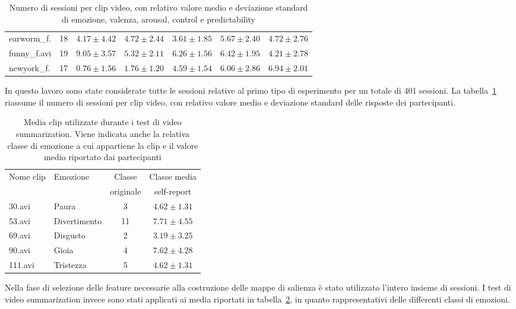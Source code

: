\begin{table}[]
\begin{tabular}{l|c|c|c|c|c|c}
earworm\_f. & 18 & $4.17 \pm 4.42$ & $4.72 \pm 2.44$ & $3.61 \pm 1.85$ & $5.67 \pm 2.40$ & $4.72 \pm 2.76$ \\
funny\_f.avi & 19 & $9.05 \pm 3.57$ & $5.32 \pm 2.11$ & $6.26 \pm 1.56$ & $6.42 \pm 1.95$ & $4.21 \pm 2.78$ \\
newyork\_f. & 17 & $0.76 \pm 1.56$ & $1.76 \pm 1.20$ & $4.59 \pm 1.54$ & $6.06 \pm 2.86$ & $6.94 \pm 2.01$ \\
\end{tabular}
\caption{Numero di sessioni per clip video, con relativo valore medio e deviazione standard di emozione, valenza, arousal, control e predictability}
\label{tab:sessionid_by_media}
\end{table}

In questo lavoro sono state considerate tutte le sessioni relative al primo tipo di esperimento per un totale di 401 sessioni.
La tabella~\ref{tab:sessionid_by_media} riassume il numero di sessioni per clip video, con relativo valore medio e deviazione standard delle risposte dei partecipanti.

\begin{table}[]
\begin{tabular}{l|l|c|c}
Nome clip   & Emozione     & Classe    & Classe media \\
            &              & originale & self-report \\
\hline
30.avi      & Paura        & 3         & $4.62 \pm 1.31$ \\
53.avi      & Divertimento & 11        & $7.71 \pm 4.55$ \\
69.avi      & Disgusto     & 2         & $3.19 \pm 3.25$ \\
90.avi      & Gioia        & 4         & $7.62 \pm 4.28$ \\
111.avi     & Tristezza    & 5         & $4.62 \pm 1.31$ \\
\end{tabular}
\caption{Media clip utilizzate durante i test di video summarization. Viene indicata anche la relativa classe di emozione a cui appartiene la clip e il valore medio riportato dai partecipanti}
\label{tab:used_media}
\end{table}

Nella fase di selezione delle feature necessarie alla costruzione delle mappe di salienza è stato utilizzato l'intero insieme di  sessioni. I test di video summarization invece sono stati applicati ai media riportati in tabella~\ref{tab:used_media}, in quanto rappresentativi delle differenti classi di emozioni.

